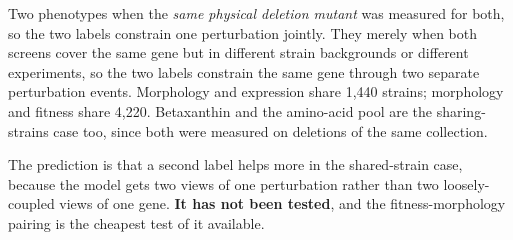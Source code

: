  Two phenotypes  when the \emph{same physical deletion mutant}
was measured for both, so the two labels constrain one perturbation jointly. They merely
 when both screens cover the same gene but in different strain
backgrounds or different experiments, so the two labels constrain the same gene through two
separate perturbation events. Morphology and expression share 1,440 strains; morphology and
fitness share 4,220. Betaxanthin and the amino-acid pool are the sharing-strains case too,
since both were measured on deletions of the same collection.

The prediction is that a second label helps more in the shared-strain case, because the
model gets two views of one perturbation rather than two loosely-coupled views of one gene.
\textbf{It has not been tested}, and the fitness-morphology pairing is the cheapest test of
it available.
